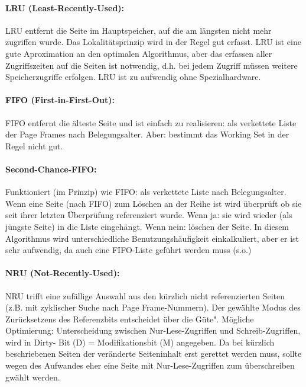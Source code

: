 \begin{answer}
  \paragraph{LRU (Least-Recently-Used):}
  LRU entfernt die Seite im Hauptspeicher, auf die am längsten nicht mehr zugriffen
  wurde. Das Lokalitätsprinzip wird in der Regel gut erfasst. LRU ist eine gute
  Aproximation an den optimalen Algorithmus,
  aber das erfassen aller Zugriffszeiten auf die Seiten ist notwendig, d.h. bei jedem
  Zugriff müssen weitere Speicherzugriffe erfolgen. LRU ist zu aufwendig ohne Spezialhardware.

  \paragraph{FIFO (First-in-First-Out):}
  FIFO entfernt die älteste Seite und ist einfach zu realisieren: als verkettete Liste der
  Page Frames nach Belegungsalter.
  Aber: bestimmt das Working Set in der Regel nicht gut.

  \paragraph{Second-Chance-FIFO:}
  Funktioniert (im Prinzip) wie FIFO: als verkettete Liste nach Belegungsalter. Wenn
  eine Seite (nach FIFO) zum Löschen an der Reihe ist wird überprüft ob sie seit
  ihrer letzten Überprüfung referenziert wurde. Wenn ja: sie wird wieder (als jüngste
  Seite) in die Liste eingehängt. Wenn nein: löschen der Seite.
  In diesem Algorithmus wird unterschiedliche Benutzungshäufigkeit einkalkuliert,
  aber er ist sehr aufwendig, da auch eine FIFO-Liste geführt werden muss (s.o.)

  \paragraph{NRU (Not-Recently-Used):}
  NRU trifft eine zufällige Auswahl aus den kürzlich nicht referenzierten Seiten (z.B.
  mit zyklischer Suche nach Page Frame-Nummern). Der gewählte Modus des Zurücksetzens
  des Referenzbits entscheidet über die Güte".
  Mögliche Optimierung:
  Unterscheidung zwischen Nur-Lese-Zugriffen und Schreib-Zugriffen, wird in Dirty-
  Bit (D) = Modifikationsbit (M) angegeben.
  Da bei kürzlich beschriebenen Seiten der veränderte Seiteninhalt erst gerettet werden
  muss, sollte wegen des Aufwandes eher eine Seite mit Nur-Lese-Zugriffen zum
  überschreiben gwählt werden.


\end{answer}

